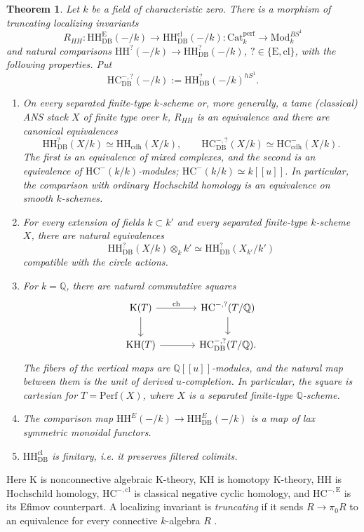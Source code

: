 \documentclass{amsart}
\theoremstyle{plain}
\newtheorem{theorem}[prop]{Theorem}
\theoremstyle{definition}
\newcommand{\ra}{\rightarrow}
\newcommand{\bbQ}{\mathbb{Q}}
\newcommand{\Catperf}{\mathrm{Cat}^{\mathrm{perf}}}
\newcommand{\Perf}{\mathrm{Perf}}
\newcommand{\HH}{\mathrm{HH}}
\newcommand{\HC}{\mathrm{HC}}
\newcommand{\K}{\mathrm{K}}
\newcommand{\KH}{\mathrm{KH}}
\newcommand{\Mod}{\mathrm{Mod}}
\DeclareMathOperator{\ch}{ch}
\newcommand{\DB}{\mathrm{DB}}
\newcommand{\cl}{\mathrm{cl}}
\newcommand{\cdh}{\mathrm{cdh}}
\newcommand{\E}{\mathrm{E}}
\begin{document}
\begin{theorem}\label{thmHHDBdefining}
Let $k$ be a field of characteristic zero. There is a morphism of truncating localizing invariants
\[
R_{HH}:\HH^\mathrm{E}_{\DB}(-/k)\ra\HH^\cl_{\DB}(-/k):
\Catperf_k\longrightarrow\Mod_k^{BS^1}
\]
and natural comparisons
$\HH^{?}(-/k)\to\HH^?_{\DB}(-/k)$, $?\in\{\E, \cl\}$, with the following properties.
Put
\[
\HC^{-,?}_{\DB}(-/k):=\HH^?_{\DB}(-/k)^{hS^1}.
\]

\begin{enumerate}
\item
On every separated finite-type $k$-scheme or, more generally, a tame (classical) ANS stack $X$ of finite type over $k$, $R_{HH}$ is an equivalence and there are canonical equivalences
\[
\HH^?_{\DB}(X/k)\simeq\HH_{\cdh}(X/k),
\qquad
\HC^{-,?}_{\DB}(X/k)\simeq\HC^-_{\cdh}(X/k).
\]
The first is an equivalence of mixed complexes, and the second is an equivalence of $\HC^-(k/k)$-modules; $\HC^-(k/k)\simeq k[[u]]$.
In particular, the comparison with ordinary Hochschild homology is an equivalence on smooth $k$-schemes.

\item
For every extension of fields $k\subset k'$ and every separated finite-type $k$-scheme $X$, there are natural equivalences
\[
\HH^?_{\DB}(X/k)\otimes_k k'
\simeq
\HH^?_{\DB}(X_{k'}/k')
\]
compatible with the circle actions.

\item
For $k=\bbQ$, there are natural commutative squares
\[
\begin{tikzcd}[column sep=large]
\K(T)\arrow[r,"\ch"]\arrow[d]
  &\HC^{-,?}(T/\bbQ)\arrow[d]\\
\KH(T)\arrow[r]
  &\HC^{-,?}_{\DB}(T/\bbQ).
\end{tikzcd}
\]
The fibers of the vertical maps are $\bbQ[[u]]$-modules, and the natural map between them is the unit of derived $u$-completion. In particular, the square is cartesian for $T=\Perf(X)$, where $X$ is a separated finite-type $\bbQ$-scheme.

\item The comparison map $\HH^{E}(-/k)\to\HH^E_{\DB}(-/k)$ is a map of lax symmetric monoidal functors.

\item $\HH_\DB^\cl$ is finitary, i.e. it preserves filtered colimits.
\end{enumerate}
\end{theorem}

Here $\K$ is nonconnective algebraic $\K$-theory, $\KH$
is homotopy $\K$-theory, $\HH$ is Hochschild homology, $\HC^{-,\cl}$ is classical negative cyclic homology, and $\HC^{-,\E}$ is its Efimov counterpart. A localizing invariant is \emph{truncating} if it sends
$R\to\pi_0R$ to an equivalence for every connective
$k$-algebra $R$ \cite{LT19}.
\end{document}
